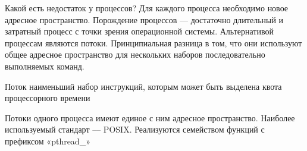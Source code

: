 Какой есть недостаток у процессов? Для каждого процесса необходимо новое адресное пространство. Порождение процессов --- достаточно длительный и затратный процесс с точки зрения операционной системы. Альтернативой процессам являются потоки. Принципиальная разница в том, что они используют общее адресное пространство для нескольких наборов последовательно выполняемых команд.

\begin{defi}{Поток}
	наименьший набор инструкций, которым может быть выделена квота процессорного времени 
\end{defi}

Потоки одного процесса имеют единое с ним адресное пространство. Наиболее используемый стандарт –-- POSIX. Реализуются семейством функций с префиксом «pthread\_»
